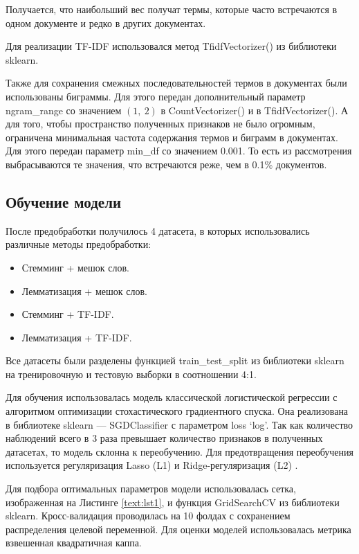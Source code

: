 \documentclass[14pt]{mmcs_article}
\begin{document}
Получается, что наибольший вес получат термы, которые часто встречаются в одном документе и редко в других документах.

Для реализации TF-IDF использовался метод TfidfVectorizer() из библиотеки sklearn. 

Также для сохранения смежных последовательностей термов в документах были использованы биграммы. Для этого передан дополнительный параметр ngram\_range со значением $(1,\ 2)$ в CountVectorizer() и в TfidfVectorizer(). А для того, чтобы пространство полученных признаков не было огромным, ограничена минимальная частота содержания термов и биграмм в документах. Для этого передан параметр min\_df со значением 0.001. То есть из рассмотрения выбрасываются те значения, что встречаются реже, чем в 0.1\% документов.


\subsection{Обучение модели}

После предобработки получилось 4 датасета, в которых использовались различные методы предобработки:
\begin{itemize}
	\item Стемминг + мешок слов.
	\item Лемматизация + мешок слов.
	\item Стемминг + TF-IDF.
	\item Лемматизация + TF-IDF.
\end{itemize}

Все датасеты были разделены функцией train\_test\_split из библиотеки sklearn на тренировочную и тестовую выборки в соотношении 4:1.

Для обучения использовалась модель классической логистической регрессии с алгоритмом оптимизации стохастического градиентного спуска. Она реализована в библиотеке sklearn --- SGDClassifier с параметром loss `log'.  Так как количество наблюдений всего в 3 раза превышает количество признаков в полученных датасетах, то модель склонна к переобучению. Для предотвращения переобучения используется регуляризация Lasso (L1) и Ridge-регуляризация (L2) \cite{lib:regular}.

Для подбора оптимальных параметров модели использовалась сетка, изображенная на Листинге \ref{text:lst1}, и функция GridSearchCV из библиотеки sklearn. Кросс-валидация проводилась на 10 фолдах с сохранением распределения целевой переменной. Для оценки моделей использовалась метрика взвешенная квадратичная каппа.
\end{document}
